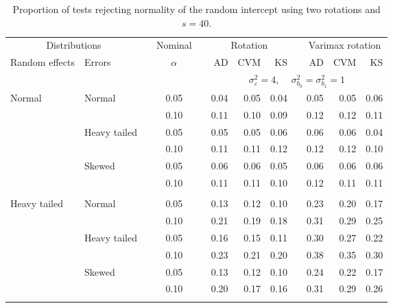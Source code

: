 \begin{table}[ht]
\centering
\caption{\label{tab:simb040} Proportion of tests rejecting normality of the random intercept using two rotations and $s = 40$.}
\begin{scriptsize}
\begin{tabular}{ll p{.1cm} c p{.1cm} rrr p{.1cm} rrr}
  \hline
  \multicolumn{2}{c}{Distributions}& & Nominal & &  \multicolumn{3}{c}{Rotation} & & \multicolumn{3}{c}{Varimax rotation} \\ \cline{1-2} \cline{6-8} \cline{10-12}   
  Random effects & Errors & & $\alpha$ & & AD & CVM & KS & & AD & CVM & KS \\ 
   \hline
& && && \multicolumn{7}{c}{$\sigma_{\varepsilon}^2 = 4$, \ \ $\sigma_{b_0}^2 = \sigma_{b_1}^2 = 1$} \\ \cline{6-12}
\rowcolor{gray!20}Normal       & Normal       && 0.05 &&   0.04 & 0.05 & 0.04 && 0.05 & 0.05 & 0.06 \\ 
\rowcolor{gray!20}             &              && 0.10 &&   0.11 & 0.10 & 0.09 && 0.12 & 0.12 & 0.11 \\ 
\rowcolor{gray!20}             & Heavy tailed && 0.05 &&   0.05 & 0.05 & 0.06 && 0.06 & 0.06 & 0.04 \\ 
\rowcolor{gray!20}             &              && 0.10 &&   0.11 & 0.11 & 0.12 && 0.12 & 0.12 & 0.10 \\ 
\rowcolor{gray!20}             & Skewed       && 0.05 &&   0.06 & 0.06 & 0.05 && 0.06 & 0.06 & 0.06 \\ 
\rowcolor{gray!20}             &              && 0.10 &&   0.11 & 0.11 & 0.10 && 0.12 & 0.11 & 0.11 \\ 
             &&&&&&&&&&&\\
Heavy tailed & Normal       && 0.05 &&   0.13 & 0.12 & 0.10 && 0.23 & 0.20 & 0.17 \\ 
             &              && 0.10 &&   0.21 & 0.19 & 0.18 && 0.31 & 0.29 & 0.25 \\ 
             & Heavy tailed && 0.05 &&   0.16 & 0.15 & 0.11 && 0.30 & 0.27 & 0.22 \\ 
             &              && 0.10 &&   0.23 & 0.21 & 0.20 && 0.38 & 0.35 & 0.30 \\ 
             & Skewed       && 0.05 &&   0.13 & 0.12 & 0.10 && 0.24 & 0.22 & 0.17 \\ 
             &              && 0.10 &&   0.20 & 0.17 & 0.16 && 0.31 & 0.29 & 0.26 \\ 
             &&&&&&&&&&&\\

\end{tabular}
\end{scriptsize}
\end{table}
